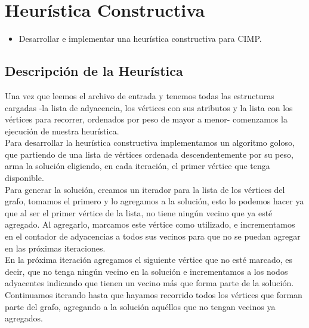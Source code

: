 \documentclass[a4paper, 10pt]{article}
\begin{document}
\newpage

\section{Heur\'istica Constructiva}
\begin{itemize}
	\item Desarrollar e implementar una heur\'istica constructiva para CIMP.
\end{itemize}

\subsection{Descripci\'on de la Heur\'istica}
Una vez que leemos el archivo de entrada y tenemos todas las estructuras cargadas -la lista de adyacencia, los v\'ertices con sus atributos y la lista con los v\'ertices para recorrer, ordenados por peso de mayor a menor- comenzamos la ejecuci\'on de nuestra heur\'istica.\\

Para desarrollar la heur\'istica constructiva implementamos un algoritmo goloso, que partiendo de una lista de v\'ertices ordenada descendentemente por su peso, arma la soluci\'on eligiendo, en cada iteraci\'on, el primer v\'ertice que tenga disponible. \\

Para generar la soluci\'on, creamos un iterador para la lista de los v\'ertices del grafo, tomamos el primero y lo agregamos a la soluci\'on, esto lo podemos hacer ya que al ser el primer v\'ertice de la lista, no tiene ning\'un vecino que ya est\'e agregado. Al agregarlo, marcamos este v\'ertice como utilizado, e incrementamos en el contador de adyacencias a todos sus vecinos para que no se puedan agregar en las pr\'oximas iteraciones.\\

En la pr\'oxima iteraci\'on agregamos el siguiente v\'ertice que no est\'e marcado, es decir, que no tenga ning\'un vecino en la soluci\'on e incrementamos a los nodos adyacentes indicando que tienen un vecino m\'as que forma parte de la soluci\'on.\\

Continuamos iterando hasta que hayamos recorrido todos los v\'ertices que forman parte del grafo, agregando a la soluci\'on aqu\'ellos que no tengan vecinos ya agregados. \\
\end{document}
